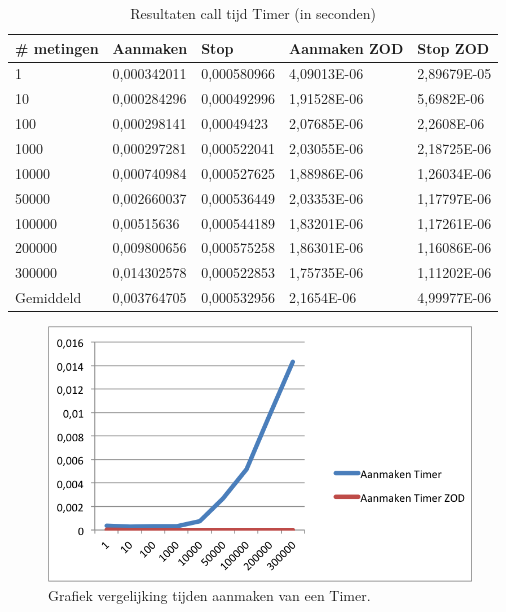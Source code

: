 \begin{table}[]
\centering
\begin{tabular}{|l|l|l|l|l|}
\hline
\# metingen   & Aanmaken    & Stop        & Aanmaken ZOD & Stop ZOD    \\ \hline
1         & 0,000342011 & 0,000580966 & 4,09013E-06  & 2,89679E-05 \\ \hline
10        & 0,000284296 & 0,000492996 & 1,91528E-06  & 5,6982E-06  \\ \hline
100       & 0,000298141 & 0,00049423  & 2,07685E-06  & 2,2608E-06  \\ \hline
1000      & 0,000297281 & 0,000522041 & 2,03055E-06  & 2,18725E-06 \\ \hline
10000     & 0,000740984 & 0,000527625 & 1,88986E-06  & 1,26034E-06 \\ \hline
50000     & 0,002660037 & 0,000536449 & 2,03353E-06  & 1,17797E-06 \\ \hline
100000    & 0,00515636  & 0,000544189 & 1,83201E-06  & 1,17261E-06 \\ \hline
200000    & 0,009800656 & 0,000575258 & 1,86301E-06  & 1,16086E-06 \\ \hline
300000    & 0,014302578 & 0,000522853 & 1,75735E-06  & 1,11202E-06 \\ \hline
Gemiddeld & 0,003764705 & 0,000532956 & 2,1654E-06   & 4,99977E-06 \\ \hline
\end{tabular}
\caption{Resultaten call tijd Timer (in seconden)}
\label{Table:Timer}
\end{table}

\begin{figure}[!h]
  \centering
  \includegraphics[scale=1.0]{Afbeeldingen/Evaluatie/AanmakenTimer}
  \caption{Grafiek vergelijking tijden aanmaken van een Timer.}
  \label{fig:GraphTimer}
\end{figure}

